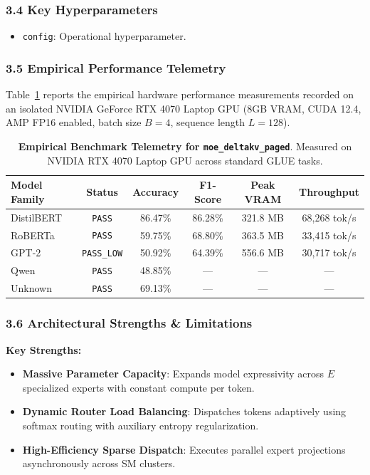 \subsubsection*{3.4 Key Hyperparameters}
\begin{itemize}
    \item \texttt{config}: Operational hyperparameter.
\end{itemize}

\subsubsection*{3.5 Empirical Performance Telemetry}
Table~\ref{tab:telemetry_moe_deltakv_paged} reports the empirical hardware performance measurements recorded on an isolated NVIDIA GeForce RTX 4070 Laptop GPU (8GB VRAM, CUDA 12.4, AMP FP16 enabled, batch size $B=4$, sequence length $L=128$).

\begin{table}[h]
\centering
\small
\caption{\textbf{Empirical Benchmark Telemetry for \texttt{moe\_deltakv\_paged}}. Measured on NVIDIA RTX 4070 Laptop GPU across standard GLUE tasks.}
\label{tab:telemetry_moe_deltakv_paged}
\begin{tabular*}{\columnwidth}{@{\extracolsep{\fill}}lccccc}
\toprule
\textbf{Model Family} & \textbf{Status} & \textbf{Accuracy} & \textbf{F1-Score} & \textbf{Peak VRAM} & \textbf{Throughput} \\
\midrule
DistilBERT & \texttt{PASS} & 86.47\% & 86.28\% & 321.8 MB & 68,268 tok/s \\
RoBERTa & \texttt{PASS} & 59.75\% & 68.80\% & 363.5 MB & 33,415 tok/s \\
GPT-2 & \texttt{PASS\_LOW} & 50.92\% & 64.39\% & 556.6 MB & 30,717 tok/s \\
Qwen & \texttt{PASS} & 48.85\% & --- & --- & --- \\
Unknown & \texttt{PASS} & 69.13\% & --- & --- & --- \\
\bottomrule
\end{tabular*}
\end{table}

\subsubsection*{3.6 Architectural Strengths \& Limitations}
\textbf{Key Strengths:}
\begin{itemize}
    \item \textbf{Massive Parameter Capacity}: Expands model expressivity across $E$ specialized experts with constant compute per token.
    \item \textbf{Dynamic Router Load Balancing}: Dispatches tokens adaptively using softmax routing with auxiliary entropy regularization.
    \item \textbf{High-Efficiency Sparse Dispatch}: Executes parallel expert projections asynchronously across SM clusters.
\end{itemize}

